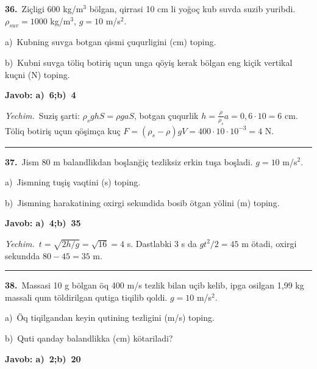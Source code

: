 \documentclass[11pt,a4paper]{article}
\begin{document}
\noindent\textbf{36.}\ Ziçligi 600 kg/m$^3$ bölgan, qirrasi 10 cm li yoğoç kub suvda suzib yuribdi. $\rho_{suv}=1000$ kg/m$^3$, $g=10$ m/s$^2$.\par
\noindent\hspace*{4mm}a)\ Kubning suvga botgan qismi çuqurligini (cm) toping.\par
\noindent\hspace*{4mm}b)\ Kubni suvga töliq botiriş uçun unga qöyiş kerak bölgan eng kiçik vertikal kuçni (N) toping.\par
\noindent\colorbox{gray!12}{\parbox{\dimexpr\linewidth-2\fboxsep}{\textbf{Javob: a)\ 6;\quad b)\ 4}}}\par\smallskip
\noindent\textit{Yechim.}\ Suziş şarti: $\rho_s ghS=\rho gaS$, botgan çuqurlik $h=\frac{\rho}{\rho_s}a=0{,}6\cdot10=6$ cm. Töliq botiriş uçun qöşimça kuç $F=(\rho_s-\rho)gV=400\cdot10\cdot10^{-3}=4$ N.\par\par\medskip\hrule\medskip
{}\noindent\textbf{37.}\ Jism 80 m balandlikdan boşlanğiç tezliksiz erkin tuşa boşladi. $g=10$ m/s$^2$.\par
\noindent\hspace*{4mm}a)\ Jismning tuşiş vaqtini (s) toping.\par
\noindent\hspace*{4mm}b)\ Jismning harakatining oxirgi sekundida bosib ötgan yölini (m) toping.\par
\noindent\colorbox{gray!12}{\parbox{\dimexpr\linewidth-2\fboxsep}{\textbf{Javob: a)\ 4;\quad b)\ 35}}}\par\smallskip
\noindent\textit{Yechim.}\ $t=\sqrt{2h/g}=\sqrt{16}=4$ s. Dastlabki 3 s da $gt^2/2=45$ m ötadi, oxirgi sekundda $80-45=35$ m.\par\par\medskip\hrule\medskip
{}\noindent\textbf{38.}\ Massasi 10 g bölgan öq 400 m/s tezlik bilan uçib kelib, ipga osilgan 1,99 kg massali qum töldirilgan qutiga tiqilib qoldi. $g=10$ m/s$^2$.\par
\noindent\hspace*{4mm}a)\ Öq tiqilgandan keyin qutining tezligini (m/s) toping.\par
\noindent\hspace*{4mm}b)\ Quti qanday balandlikka (cm) kötariladi?\par
\noindent\colorbox{gray!12}{\parbox{\dimexpr\linewidth-2\fboxsep}{\textbf{Javob: a)\ 2;\quad b)\ 20}}}\par\smallskip
\end{document}
